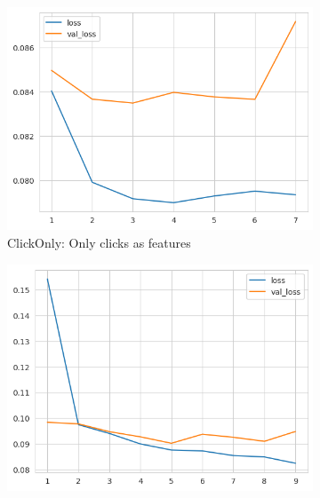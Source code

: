 %

\begin{figure}[htbp!]
  \centering
  \begin{subfigure}[b]{0.45\textwidth}
    \centering
    \includegraphics[width=\textwidth]{graphics/model_history_loss_clicks}
    \caption{ClickOnly: Only clicks as features}
    \label{fig:model_history_loss_clicks}
  \end{subfigure}
  \hfill
  \begin{subfigure}[b]{0.45\textwidth}
    \centering
    \includegraphics[width=\textwidth]{graphics/model_history_loss_features}

\end{subfigure}
\end{figure}
